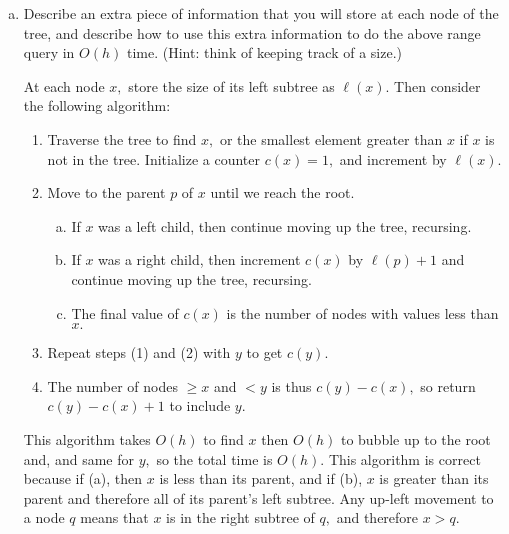 \documentclass{article}
\begin{document}
\begin{enumerate}[(a)]
	\item Describe an extra piece of information that you will store at each node of the tree, and describe how to use this extra information to do the above range query in $O(h)$ time. (Hint: think of keeping track of a size.)
		\begin{soln}
			At each node $x,$ store the size of its left subtree as $\ell(x).$ Then consider the following algorithm:
			\begin{enumerate}[(1)]
				\item Traverse the tree to find $x,$ or the smallest element greater than $x$ if $x$ is not in the tree. Initialize a counter $c(x)= 1,$ and increment by $\ell(x).$
				\item Move to the parent $p$ of $x$ until we reach the root.
					\begin{enumerate}[(a)]
						\item If $x$ was a left child, then continue moving up the tree, recursing.
						\item If $x$ was a right child, then increment $c(x)$ by $\ell(p)+1$ and continue moving up the tree, recursing. 
						\item The final value of $c(x)$ is the number of nodes with values less than $x.$
					\end{enumerate}
				\item Repeat steps (1) and (2) with $y$ to get $c(y).$
				\item The number of nodes $\ge x$ and $<y$ is thus $c(y)-c(x),$ so return $c(y)-c(x)+1$ to include $y.$
			\end{enumerate}

			This algorithm takes $O(h)$ to find $x$ then $O(h)$ to bubble up to the root and, and same for $y,$ so the total time is $O(h).$ This algorithm is correct because if (a), then $x$ is less than its parent, and if (b), $x$ is greater than its parent and therefore all of its parent's left subtree. Any up-left movement to a node $q$ means that $x$ is in the right subtree of $q,$ and therefore $x>q.$
		\end{soln}


\end{enumerate}
\end{document}
